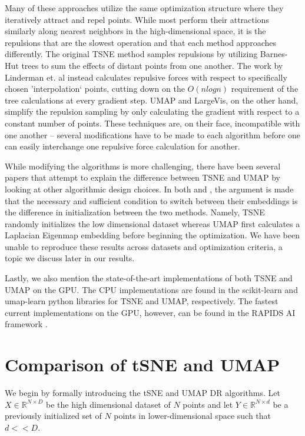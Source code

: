 \documentclass[sigconf, nonacm]{acmart}
\begin{document}
Many of these approaches utilize the same optimization structure where they iteratively attract and repel points. While most perform their attractions similarly
along nearest neighbors in the high-dimensional space, it is the repulsions that are the slowest operation and that each method approaches differently.
The original TSNE method samples repulsions by utilizing Barnes-Hut trees to sum the effects of distant points from one another.
The work by Linderman et. al instead calculates repulsive forces with respect to specifically chosen 'interpolation` points, cutting down on the $O(nlogn)$
requirement of the tree calculations at every gradient step. UMAP and LargeVis, on the other hand, simplify the repulsion sampling by only calculating the
gradient with respect to a constant number of points. These techniques are, on their face, incompatible with one another -- several modifications have to be made
to each algorithm before one can easily interchange one repulsive force calculation for another.

While modifying the algorithms is more challenging, there have been several papers that attempt to explain the difference between TSNE and UMAP by looking at
other algorithmic design choices. In both \cite{kobak2019umap} and \cite{kobak2021initialization},
the argument is made that the necessary and sufficient condition to switch between their embeddings is the difference in initialization between the two methods.
Namely, TSNE randomly initializes the low dimensional dataset whereas UMAP first calculates a Laplacian Eigenmap \cite{belkin2003laplacian} embedding before
beginning the optimization. We have been unable to reproduce these results across datasets and optimization criteria, a topic we discuss later in our results.

Lastly, we also mention the state-of-the-art implementations of both TSNE and UMAP on the GPU. The CPU implementations are found in the scikit-learn and
umap-learn python libraries for TSNE and UMAP, respectively. The fastest current implementations on the GPU, however, can be found in the RAPIDS AI
framework \cite{nolet2020bringing} \cite{rapidsframework}.




\section{Comparison of tSNE and UMAP} \label{comparison}
We begin by formally introducing the tSNE and UMAP DR algorithms. Let $X \in \mathbb{R}^{N \times D}$ be the high dimensional dataset of $N$ points and let $Y
\in \mathbb{R}^{N \times d}$ be a previously initialized set of $N$ points in lower-dimensional space such that $d << D$. 
\end{document}
